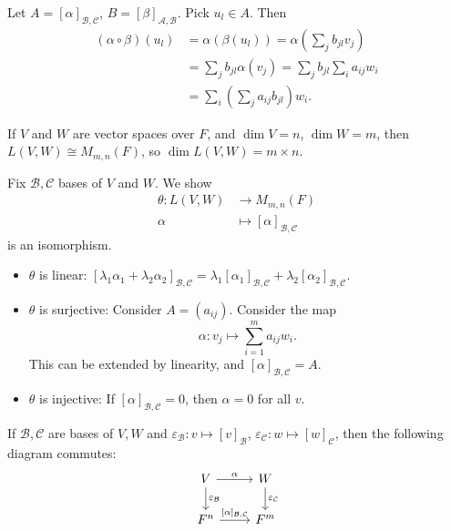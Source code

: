 \documentclass[12pt]{article}
\begin{document}
\begin{proofbox}
	Let $A = [\alpha]_{\mathcal{B}, \mathcal{C}}$, $B = [\beta]_{\mathcal{A}, \mathcal{B}}$. Pick $u_l \in A$. Then
	\begin{align*}
		(\alpha \circ \beta)(u_l) &= \alpha(\beta(u_l)) = \alpha\left( \sum_{j} b_{jl} v_j \right) \\
					  &= \sum_{j} b_{jl} \alpha(v_j) = \sum_{j}b_{jl}\sum_{i}a_{ij}w_i \\
					  &= \sum_{i}\left( \sum_{j} a_{ij} b_{jl} \right) w_i.
	\end{align*}
\end{proofbox}

\begin{proposition}
If $V$ and $W$ are vector spaces over $F$, and $\dim V = n$, $\dim W = m$, then $L(V, W) \cong M_{m, n}(F)$, so $\dim L(V, W) = m \times n$.
\end{proposition}

\begin{proofbox}
	Fix $\mathcal{B}, \mathcal{C}$ bases of $V$ and $W$. We show
\begin{align*}
	\theta : L(V, W) &\to M_{m, n}(F) \\
	\alpha &\mapsto [\alpha]_{\mathcal{B}, \mathcal{C}}
\end{align*}
is an isomorphism.
\begin{itemize}
	\item $\theta$ is linear:
		$[\lambda_1 \alpha_1 + \lambda_2 \alpha_2]_{\mathcal{B}, \mathcal{C}} = \lambda_1 [\alpha_1]_{\mathcal{B}, \mathcal{C}} + \lambda_2[\alpha_2]_{\mathcal{B}, \mathcal{C}}$.
	\item $\theta$ is surjective: Consider $A = (a_{ij})$. Consider the map
		\[
		\alpha : v_j \mapsto \sum_{i = 1}^{m} a_{ij}w_i
		.\]
		This can be extended by linearity, and $[\alpha]_{\mathcal{B}, \mathcal{C}} = A$.
	\item $\theta$ is injective: If $[\alpha]_{\mathcal{B}, \mathcal{C}} = 0$, then $\alpha = 0$ for all $v$.
\end{itemize}
\end{proofbox}

\begin{remark}
	If $\mathcal{B}, \mathcal{C}$ are bases of $V, W$ and $\varepsilon_{\mathcal{B}} : v \mapsto [v]_{\mathcal{B}}$, $\varepsilon_{\mathcal{C}} : w \mapsto [w]_{\mathcal{C}}$, then the following diagram commutes:
	\[
		\begin{tikzcd}
			V \arrow[r, "\alpha"] \arrow[d, "\varepsilon_{\mathcal{B}}"] & W \arrow[d, "\varepsilon_{\mathcal{C}}"] \\
			F^{n} \arrow[r, "{[\alpha]_{\mathcal{B},\mathcal{C}}}"] & F^{m}
		\end{tikzcd}
	\] 
\end{remark}
\end{document}
